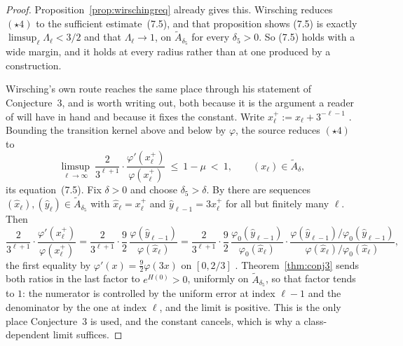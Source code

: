 \documentclass[11pt]{article}
\theoremstyle{definition}
\theoremstyle{remark}
\begin{document}
\begin{proof}
Proposition~\ref{prop:wirschingreq} already gives this. Wirsching
reduces $(\star4)$ to the sufficient estimate~(7.5), and that
proposition shows (7.5) is exactly $\limsup_\ell\Lambda_\ell<3/2$ and that
$\Lambda_\ell\to1$, on $\widetilde A_{\delta_5}$ for every
$\delta_5>0$. So (7.5) holds with a wide margin, and it holds at every
radius rather than at one produced by a construction.

Wirsching's own route reaches the same place through his statement of
Conjecture~3, and is worth writing out, both because it is the argument
a reader of \cite{Wirsching2003} will have in hand and because it fixes
the constant. Write $x_\ell^+:=x_\ell+3^{-\ell-1}$ \cite[\S7]{Wirsching2003}. Bounding
the transition kernel above and below by $\varphi$, the source reduces
$(\star4)$ to
\begin{equation}\label{eq:w75}
 \limsup_{\ell\to\infty}\ \frac{2}{3^{\ell+1}}\cdot
 \frac{\varphi'(x_\ell^+)}{\varphi(x_\ell^+)}\ \le\ 1-\mu\ <\ 1,
 \qquad(x_\ell)\in\widetilde A_\delta,
\end{equation}
its equation~(7.5). Fix $\delta>0$ and choose $\delta_5>\delta$. By
\cite[eq.~(7.14)]{Wirsching2003} there are sequences
$(\widehat x_\ell),(\widehat y_\ell)\in\widetilde A_{\delta_5}$ with
$\widehat x_\ell=x_\ell^+$ and $\widehat y_{\ell-1}=3x_\ell^+$ for all
but finitely many $\ell$. Then
\[
 \frac{2}{3^{\ell+1}}\cdot\frac{\varphi'(x_\ell^+)}{\varphi(x_\ell^+)}
 =\frac{2}{3^{\ell+1}}\cdot\frac92\,
   \frac{\varphi(\widehat y_{\ell-1})}{\varphi(\widehat x_\ell)}
 =\frac{2}{3^{\ell+1}}\cdot\frac92\,
   \frac{\varphi_0(\widehat y_{\ell-1})}{\varphi_0(\widehat x_\ell)}\cdot
   \frac{\varphi(\widehat y_{\ell-1})/\varphi_0(\widehat y_{\ell-1})}
        {\varphi(\widehat x_\ell)/\varphi_0(\widehat x_\ell)},
\]
the first equality by $\varphi'(x)=\tfrac92\varphi(3x)$ on $[0,2/3]$
\cite[eq.~(7.7)]{Wirsching2003}. Theorem~\ref{thm:conj3} sends both
ratios in the last factor to $e^{H(0)}>0$, uniformly on
$\widetilde A_{\delta_5}$, so that factor tends to $1$: the numerator is
controlled by the uniform error at index $\ell-1$ and the denominator by
the one at index $\ell$, and the limit is positive. This is the only
place Conjecture~3 is used, and the constant cancels, which is why a
class-dependent limit suffices.


\end{proof}
\end{document}
